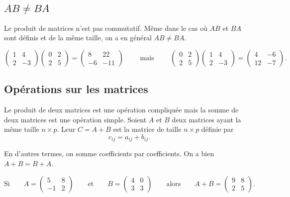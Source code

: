 \documentclass[11pt,class=report,crop=false]{standalone}
\begin{document}
\subsection{$AB \neq BA$}


Le produit de matrices n'est pas commutatif.
Même dans le cas où $AB$ et $BA$ sont définis et de la même taille, on a en général $AB\neq BA$.

\begin{exemple}
	$$\begin{pmatrix}
		1&4\\2&-3
	\end{pmatrix}
	\begin{pmatrix}
		0&2\\2&5
	\end{pmatrix}=
	\begin{pmatrix}
		8&22\\-6&-11
	\end{pmatrix}
	\qquad \text{ mais } \qquad
	\begin{pmatrix}
		0&2\\2&5
	\end{pmatrix}
	\begin{pmatrix}
	1&4\\2&-3
	\end{pmatrix}=
	\begin{pmatrix}
		4&-6\\12&-7
	\end{pmatrix}.
	$$
\end{exemple}



\subsection{Opérations sur les matrices}

Le produit de deux matrices est une opération compliquée mais la somme de deux matrices est une opération simple.
Soient $A$ et $B$ deux matrices ayant la même taille $n\times p$.
Leur  $C=A+B$ est la matrice de taille $n\times p$ définie par
	\[c_{ij}=a_{ij}+b_{ij}.\]
	
En d'autres termes, on somme coefficients par coefficients. On a bien $A+B = B+A$.


\begin{exemple}
	$$\text{Si} \qquad
	A  =  \begin{pmatrix}
		5 & 8\\
		-1 & 2
	\end{pmatrix}
	\qquad \text{et} \qquad
	B = \begin{pmatrix}
		4 & 0 \\
		3 & 3
	\end{pmatrix}
	\qquad \text{alors} \qquad A + B = \begin{pmatrix}
		9 & 8\\
		2 & 5
	\end{pmatrix}.
	$$
\end{exemple}
\end{document}
